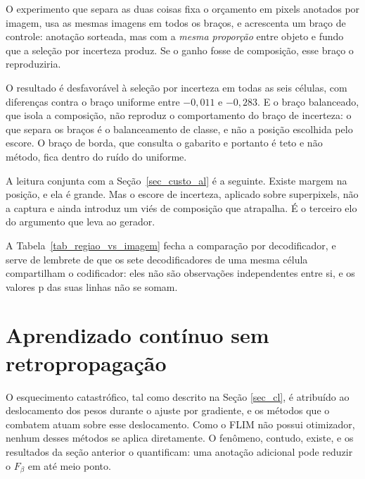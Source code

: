 O experimento que separa as duas coisas fixa o orçamento em pixels anotados por imagem, usa as mesmas imagens em todos os braços, e acrescenta um braço de controle: anotação sorteada, mas com a \emph{mesma proporção} entre objeto e fundo que a seleção por incerteza produz. Se o ganho fosse de composição, esse braço o reproduziria.

\begin{table}[htb]
\centering
\caption{Onde anotar, com orçamento fixo em pixels por imagem.}
\label{tab_onde_marcar}

\end{table}



O resultado é desfavorável à seleção por incerteza em todas as seis células, com diferenças contra o braço uniforme entre $-0{,}011$ e $-0{,}283$. E o braço balanceado, que isola a composição, não reproduz o comportamento do braço de incerteza: o que separa os braços é o balanceamento de classe, e não a posição escolhida pelo escore. O braço de borda, que consulta o gabarito e portanto é teto e não método, fica dentro do ruído do uniforme.

A leitura conjunta com a Seção~\ref{sec_custo_al} é a seguinte. Existe margem na posição, e ela é grande. Mas o escore de incerteza, aplicado sobre superpixels, não a captura e ainda introduz um viés de composição que atrapalha. É o terceiro elo do argumento que leva ao gerador.

A Tabela~\ref{tab_regiao_vs_imagem} fecha a comparação por decodificador, e serve de lembrete de que os sete decodificadores de uma mesma célula compartilham o codificador: eles não são observações independentes entre si, e os valores p das suas linhas não se somam.

\begin{table}[htb]
\centering
\caption{Seleção por região contra o controle, por decodificador.}
\label{tab_regiao_vs_imagem}

\end{table}



\section{Aprendizado contínuo sem retropropagação}

O esquecimento catastrófico, tal como descrito na Seção \ref{sec_cl}, é atribuído ao deslocamento dos pesos durante o ajuste por gradiente, e os métodos que o combatem atuam sobre esse deslocamento. Como o \ac{FLIM} não possui otimizador, nenhum desses métodos se aplica diretamente. O fenômeno, contudo, existe, e os resultados da seção anterior o quantificam: uma anotação adicional pode reduzir o $F_\beta$ em até meio ponto.

